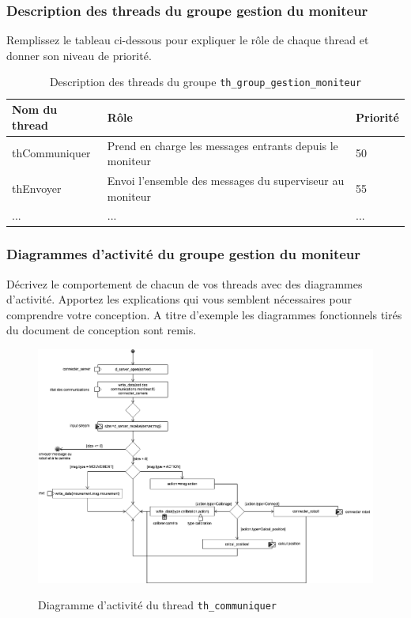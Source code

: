 \documentclass[11pt, a4paper]{paper}
\begin{document}
\subsubsection{Description des threads  du groupe gestion du moniteur}
{\color{red} Remplissez le tableau ci-dessous pour expliquer le rôle de chaque thread et donner son niveau de priorité.}


\begin{table}[htp]
\caption{Description des threads du groupe {\tt th\_group\_gestion\_moniteur}}
\begin{center}
\begin{tabular}{|p{3cm}|p{8.5cm}|p{2cm}|}
\hline
\bf Nom du thread &	\bf Rôle &	\bf Priorité \\
\hline
\hline
\color{black}thCommuniquer	& \color{black}Prend en charge les messages entrants depuis le moniteur & \color{black}50\\
\hline
\color{black}thEnvoyer	& \color{black}Envoi l'ensemble des messages du superviseur au moniteur & \color{black}55\\
\hline
\color{black}... &	\color{black}... &	\color{black}...\\
\hline
\end{tabular}
\end{center}
\label{tab:gt_moniteur}
\end{table}%

\subsubsection{Diagrammes d'activité  du groupe gestion du moniteur}
{\color{red}Décrivez le comportement de chacun de vos threads avec des diagrammes d'activité. Apportez les explications qui vous semblent nécessaires pour comprendre votre conception. A titre d'exemple les diagrammes fonctionnels tirés du document de conception sont remis.}

\begin{figure}[htbp]
\label{fig:act_communiquer}
\begin{center}
{\includegraphics[scale=.4]{./figures/communiquer}}
{\caption{Diagramme d'activité du thread {\tt th\_communiquer}}}
\end{center}
\end{figure}
\FloatBarrier
\end{document}
